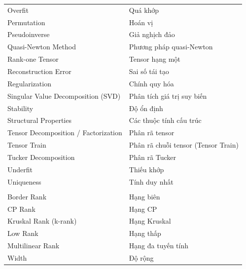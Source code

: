 \begin{longtable}{L{0.42\textwidth}L{0.48\textwidth}}
Overfit & Quá khớp \\
Permutation & Hoán vị \\
Pseudoinverse & Giả nghịch đảo \\
Quasi-Newton Method & Phương pháp quasi-Newton \\
Rank-one Tensor & Tensor hạng một \\
Reconstruction Error & Sai số tái tạo \\
Regularization & Chính quy hóa \\
Singular Value Decomposition (SVD) & Phân tích giá trị suy biến \\
Stability & Độ ổn định \\
Structural Properties & Các thuộc tính cấu trúc \\
Tensor Decomposition / Factorization & Phân rã tensor \\
Tensor Train & Phân rã chuỗi tensor (Tensor Train) \\
Tucker Decomposition & Phân rã Tucker \\
Underfit & Thiếu khớp \\
Uniqueness & Tính duy nhất \\

\addlinespace
{} \\
Border Rank & Hạng biên \\
CP Rank & Hạng CP \\
Kruskal Rank (k-rank) & Hạng Kruskal \\
Low Rank & Hạng thấp \\
Multilinear Rank & Hạng đa tuyến tính \\
Width & Độ rộng \\


\end{longtable}
